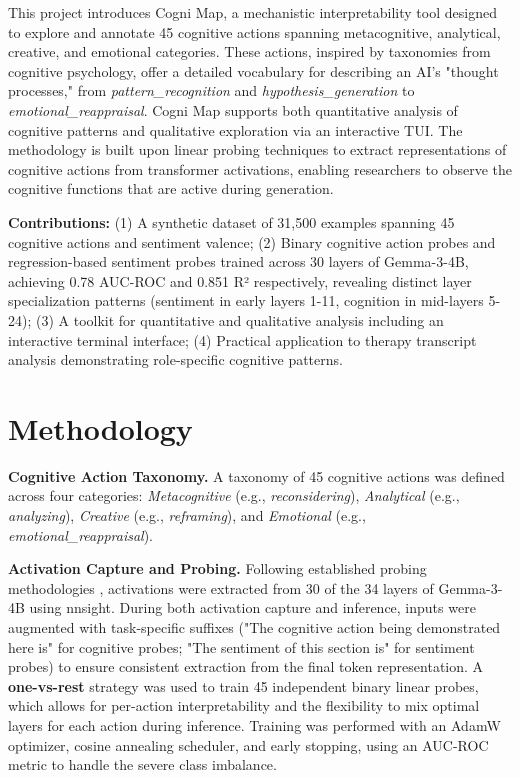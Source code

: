 \documentclass[letterpaper]{article}
\begin{document}
This project introduces Cogni Map, a mechanistic interpretability tool designed to explore and annotate 45 cognitive actions spanning metacognitive, analytical, creative, and emotional categories. These actions, inspired by taxonomies from cognitive psychology, offer a detailed vocabulary for describing an AI's "thought processes," from \textit{pattern\_recognition} and \textit{hypothesis\_generation} to \textit{emotional\_reappraisal}. Cogni Map supports both quantitative analysis of cognitive patterns and qualitative exploration via an interactive TUI. The methodology is built upon linear probing techniques \cite{alain2016understanding} to extract representations of cognitive actions from transformer activations, enabling researchers to observe the cognitive functions that are active during generation.

\textbf{Contributions:} (1) A synthetic dataset of 31,500 examples spanning 45 cognitive actions and sentiment valence; (2) Binary cognitive action probes and regression-based sentiment probes trained across 30 layers of Gemma-3-4B, achieving 0.78 AUC-ROC and 0.851 R² respectively, revealing distinct layer specialization patterns (sentiment in early layers 1-11, cognition in mid-layers 5-24); (3) A toolkit for quantitative and qualitative analysis including an interactive terminal interface; (4) Practical application to therapy transcript analysis demonstrating role-specific cognitive patterns.

\section{Methodology}

\textbf{Cognitive Action Taxonomy.} A taxonomy of 45 cognitive actions was defined across four categories: \textit{Metacognitive} (e.g., \textit{reconsidering}), \textit{Analytical} (e.g., \textit{analyzing}), \textit{Creative} (e.g., \textit{reframing}), and \textit{Emotional} (e.g., \textit{emotional\_reappraisal}).

\textbf{Activation Capture and Probing.} Following established probing methodologies \cite{alain2016understanding,chen2024designing}, activations were extracted from 30 of the 34 layers of Gemma-3-4B using nnsight. During both activation capture and inference, inputs were augmented with task-specific suffixes ("The cognitive action being demonstrated here is" for cognitive probes; "The sentiment of this section is" for sentiment probes) to ensure consistent extraction from the final token representation. A \textbf{one-vs-rest} strategy was used to train 45 independent binary linear probes, which allows for per-action interpretability and the flexibility to mix optimal layers for each action during inference. Training was performed with an AdamW optimizer, cosine annealing scheduler, and early stopping, using an AUC-ROC metric to handle the severe class imbalance.
\end{document}
